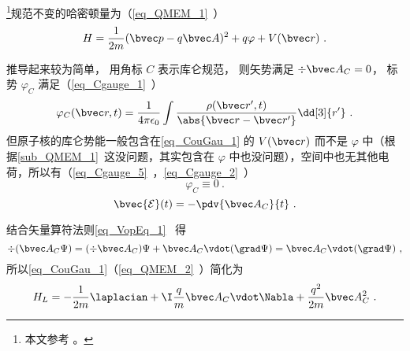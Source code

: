 
\begin{issues}
\issueDraft
\end{issues}


\footnote{本文参考 \cite{Bransden}。}规范不变的哈密顿量为（\autoref{eq_QMEM_1}~）
\begin{equation}\label{eq_CouGau_1}
H = \frac{1}{2m} (\bvec p - q\bvec A)^2 + q\varphi + V(\bvec r)~.
\end{equation}

推导起来较为简单， 用角标 $C$ 表示库仑规范， 则矢势满足 $\div \bvec A_C = 0$， 标势 $\varphi_C$ 满足（\autoref{eq_Cgauge_1}~）
\begin{equation}
\varphi_C(\bvec r, t) = \frac{1}{4\pi\epsilon_0} \int \frac{\rho(\bvec r', t)}{\abs{\bvec r - \bvec r'}} \dd[3]{r'}~.
\end{equation}
但原子核的库仑势能一般包含在\autoref{eq_CouGau_1} 的 $V(\bvec r)$ 而不是 $\varphi$ 中（根据\autoref{sub_QMEM_1}~这没问题，其实包含在 $\varphi$ 中也没问题），空间中也无其他电荷，所以有（\autoref{eq_Cgauge_5}~，\autoref{eq_Cgauge_2}~）
\begin{equation}\label{eq_CouGau_2}
\varphi_C \equiv 0~.
\end{equation}
\begin{equation}\label{eq_CouGau_3}
\bvec {\mathcal E}(t) = -\pdv{\bvec A_C}{t}~.
\end{equation}

结合矢量算符法则\autoref{eq_VopEq_1}~ 得
\begin{equation}
\div (\bvec A_C \Psi) = (\div \bvec A_C) \Psi + \bvec A_C \vdot (\grad \Psi) = \bvec A_C \vdot (\grad \Psi)~,
\end{equation}
所以\autoref{eq_CouGau_1}（\autoref{eq_QMEM_2}~）简化为
\begin{equation}\label{eq_CouGau_4}
H_L = -\frac{1}{2m} \laplacian + \I \frac{q}{m} \bvec A_C \vdot \Nabla + \frac{q^2}{2m} \bvec A_C^2~.
\end{equation}
